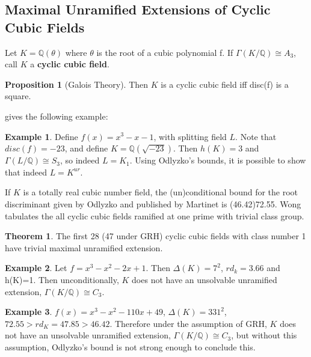 \documentclass[12pt]{extarticle}
\newcommand{\Q}{\mathbb{Q}}
\newcommand{\<}{\langle}
\renewcommand{\>}{\rangle}
\theoremstyle{definition}
\newtheorem{theorem}{Theorem}
\newtheorem{proposition}{Proposition}
\newtheorem*{example}{Example}
\begin{document}
\subsection{Maximal Unramified Extensions of Cyclic Cubic Fields}
Let $K=\Q(\theta)$ where $\theta$ is the root of a cubic polynomial 
f. If $\Gamma(K/\Q) \cong A_3$, call $K$ a  \textbf{cyclic cubic field}.
\begin{proposition}[Galois Theory]
Then $K$ is a cyclic cubic field iff disc(f) is a square. 

\cite{SERR} gives the following example:
\begin{example}
Define $f(x) = x^3-x-1$, with splitting field $L$. Note that $disc(f)=-23$, and define $K=\Q(\sqrt{-23})$. Then $h(K)=3$ and $\Gamma(L/\Q) \cong S_3$, so indeed $L=K_1$. Using Odlyzko's bounds, it is possible to show that indeed $L = K^{ur}$.
\end{example}

\end{proposition} If $K$ is a totally real cubic number field, the (un)conditional bound for the root discriminant given by Odlyzko and published by Martinet is (46.42)72.55. Wong tabulates the all cyclic cubic fields ramified at one prime with trivial class group. 
\begin{theorem}
The first 28 (47 under GRH) cyclic cubic fields with class number 1 have trivial maximal unramified extension.
\end{theorem}
\begin{example}
    Let $f=x^3-x^2-2x+1$. Then $\Delta(K)=7^2$, $rd_{k}=3.66$ and h(K)=1. Then unconditionally, $K$ does not have an unsolvable unramified extension, $\Gamma(K/\Q)\cong C_3$.
\end{example}
\begin{example}
    $f(x)=x^3 -x^2 -110x +49$, $\Delta(K)=331^2$, $72.55 > rd_{K}=47.85 > 46.42$. Therefore under the assumption of GRH, $K$ does not have an unsolvable unramified extension, $\Gamma(K/\Q)\cong C_3$, but without this assumption, Odlyzko's bound is not strong enough to conclude this.
\end{example}
\end{document}
